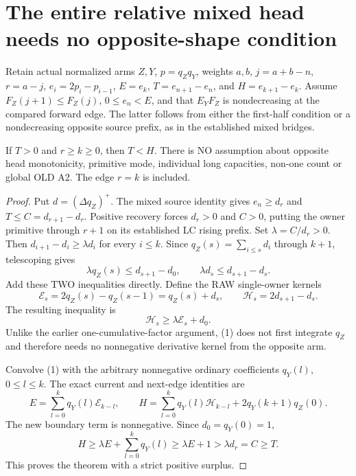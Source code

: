 \section{The entire relative mixed head needs no opposite-shape condition}
Retain actual normalized arms $Z,Y$, $p=q_Zq_Y$, weights $a,b$,
$j=a+b-n$, $r=a-j$, $e_i=2p_i-p_{i-1}$,
$E=e_k$, $T=e_{n+1}-e_n$, and $H=e_{k+1}-e_k$.
Assume $F_Z(j+1)\le F_Z(j)$, $0\le e_n<E$, and that
$E_YF_Z$ is nondecreasing at the compared forward edge.
The latter follows from either the first-half condition or a
nondecreasing opposite source prefix, as in the established mixed bridges.

\begin{theorem}
If $T>0$ and $r\ge k\ge0$, then $T<H$.
There is NO assumption about opposite head monotonicity, primitive mode,
individual long capacities, non-one count or global OLD A2.
The edge $r=k$ is included.
\end{theorem}
\begin{proof}
Put $d=(\Delta q_Z)^+$. The mixed source identity gives
$e_n\ge d_r$ and $T\le C=d_{r+1}-d_r$. Positive recovery forces
$d_r>0$ and $C>0$, putting the owner primitive through $r+1$ on
its established LC rising prefix. Set $\lambda=C/d_r>0$.
Then $d_{i+1}-d_i\ge\lambda d_i$ for every $i\le k$.
Since $q_Z(s)=\sum_{i\le s}d_i$ through $k+1$, telescoping gives
\[
 \lambda q_Z(s)\le d_{s+1}-d_0,\qquad
                  \lambda d_s\le d_{s+1}-d_s.
\]
Add these TWO inequalities directly. Define the RAW single-owner kernels
\[
 \mathcal E_s=2q_Z(s)-q_Z(s-1)=q_Z(s)+d_s,
 \qquad\mathcal H_s=2d_{s+1}-d_s.
\]
The resulting inequality is
\[
                   \mathcal H_s\ge\lambda\mathcal E_s+d_0.
                                                               \tag{1}
\]
Unlike the earlier one-cumulative-factor argument, (1) does not first
integrate $q_Z$ and therefore needs no nonnegative derivative kernel
from the opposite arm.

Convolve (1) with the arbitrary nonnegative ordinary coefficients
$q_Y(l)$, $0\le l\le k$. The exact current and next-edge identities are
\[
 E=\sum_{l=0}^k q_Y(l)\mathcal E_{k-l},\qquad
 H=\sum_{l=0}^k q_Y(l)\mathcal H_{k-l}
                                      +2q_Y(k+1)q_Z(0).
\]
The new boundary term is nonnegative. Since $d_0=q_Y(0)=1$,
\[
 H\ge\lambda E+\sum_{l=0}^k q_Y(l)
                 \ge\lambda E+1>\lambda d_r=C\ge T.
\]
This proves the theorem with a strict positive surplus.
\end{proof}

